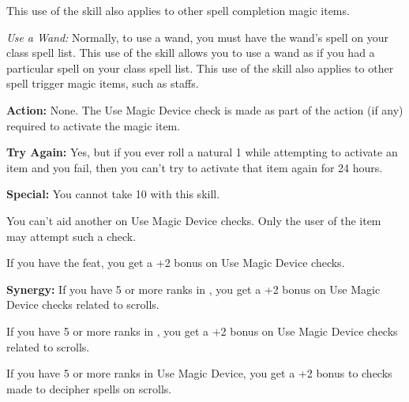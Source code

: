 This use of the skill also applies to other spell completion magic items.

\textit{Use a Wand:} Normally, to use a wand, you must have the wand's spell on your class spell list. This use of the skill allows you to use a wand as if you had a particular spell on your class spell list. This use of the skill also applies to other spell trigger magic items, such as staffs.

\textbf{Action:} None. The Use Magic Device check is made as part of the action (if any) required to activate the magic item.

\textbf{Try Again:} Yes, but if you ever roll a natural 1 while attempting to activate an item and you fail, then you can't try to activate that item again for 24 hours.

\textbf{Special:} You cannot take 10 with this skill.

You can't aid another on Use Magic Device checks. Only the user of the item may attempt such a check.

If you have the  feat, you get a +2 bonus on Use Magic Device checks.

\textbf{Synergy:} If you have 5 or more ranks in , you get a +2 bonus on Use Magic Device checks related to scrolls.

If you have 5 or more ranks in , you get a +2 bonus on Use Magic Device checks related to scrolls.

If you have 5 or more ranks in Use Magic Device, you get a +2 bonus to  checks made to decipher spells on scrolls.


